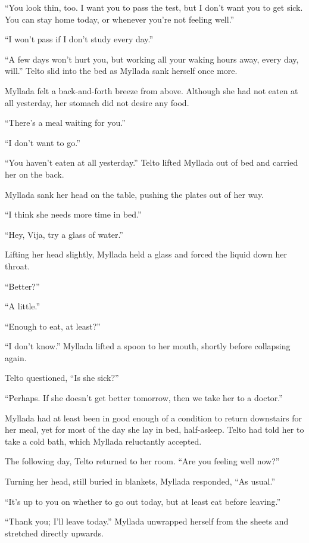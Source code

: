 ``You look thin, too. I want you to pass the test, but I don't want you to get sick. You can stay home today, or whenever you're not feeling well.''

``I won't pass if I don't study every day.''

``A few days won't hurt you, but working all your waking hours away, every day, will.'' Telto slid into the bed as Myllada sank herself once more.

Myllada felt a back-and-forth breeze from above. Although she had not eaten at all yesterday, her stomach did not desire any food.

``There's a meal waiting for you.''

``I don't want to go.''

``You haven't eaten at all yesterday.'' Telto lifted Myllada out of bed and carried her on the back.

\centeredstars

Myllada sank her head on the table, pushing the plates out of her way.

``I think she needs more time in bed.''

``Hey, Vija, try a glass of water.''

Lifting her head slightly, Myllada held a glass and forced the liquid down her throat.

``Better?''

``A little.''

``Enough to eat, at least?''

``I don't know.'' Myllada lifted a spoon to her mouth, shortly before collapsing again.

Telto questioned, ``Is she sick?''

``Perhaps. If she doesn't get better tomorrow, then we take her to a doctor.''

\centeredstars

Myllada had at least been in good enough of a condition to return downstairs for her meal, yet for most of the day she lay in bed, half-asleep. Telto had told her to take a cold bath, which Myllada reluctantly accepted.

The following day, Telto returned to her room. ``Are you feeling well now?''

Turning her head, still buried in blankets, Myllada responded, ``As usual.''

``It's up to you on whether to go out today, but at least eat before leaving.''

``Thank you; I'll leave today.'' Myllada unwrapped herself from the sheets and stretched directly upwards.

